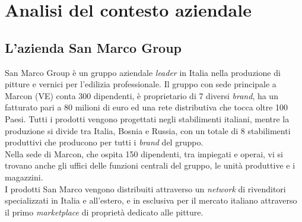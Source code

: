 
\chapter{Analisi del contesto aziendale}
\label{cap:analisi-del-contesto-aziendale}






\section{L'azienda San Marco Group}

San Marco Group è un gruppo aziendale \textit{leader} in Italia nella produzione di pitture e vernici per l'edilizia professionale. Il gruppo con sede principale a Marcon (VE) conta 300 dipendenti, è proprietario di 7 diversi \textit{brand}, ha un fatturato pari a 80 milioni di euro ed una rete distributiva che tocca oltre 100 Paesi. Tutti i prodotti vengono progettati negli stabilimenti italiani, mentre la produzione si divide tra Italia, Bosnia e Russia, con un totale di 8 stabilimenti produttivi che producono per tutti i \textit{brand} del gruppo. \\
Nella sede di Marcon, che ospita 150 dipendenti, tra impiegati e operai, vi si trovano anche gli uffici delle funzioni centrali del gruppo, le unità produttive e i magazzini.\\
I prodotti San Marco vengono distribuiti attraverso un \textit{network} di rivenditori specializzati in Italia e all'estero, e in esclusiva per il mercato italiano attraverso il primo \textit{marketplace} di proprietà dedicato alle pitture.

